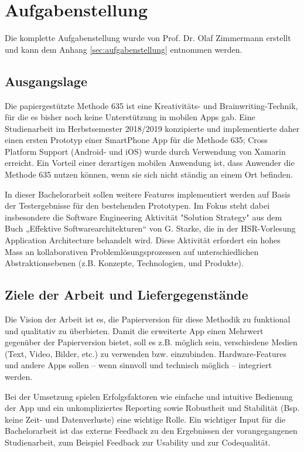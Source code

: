 
\thispagestyle{empty}
\section*{Aufgabenstellung}
Die komplette Aufgabenstellung wurde von Prof. Dr. Olaf Zimmermann erstellt und kann dem Anhang \ref{sec:aufgabenstellung} entnommen werden.

\subsection*{Ausgangslage}
Die papiergestützte Methode 635 ist eine Kreativitäts- und Brainwriting-Technik, für die es bisher noch keine Unterstützung in mobilen Apps gab. Eine Studienarbeit im Herbstsemester 2018/2019 konzipierte und implementierte daher einen ersten Prototyp einer SmartPhone App für die Methode 635; Cross Platform Support (Android- und iOS) wurde durch Verwendung von Xamarin erreicht. Ein Vorteil einer derartigen mobilen Anwendung ist, dass Anwender die Methode 635 nutzen können, wenn sie sich nicht ständig an einem Ort befinden. 


In dieser Bachelorarbeit sollen weitere Features implementiert werden auf Basis der Testergebnisse für den bestehenden Prototypen. Im Fokus steht dabei insbesondere die Software Engineering Aktivität "Solution Strategy" aus dem Buch „Effektive Softwarearchitekturen“ von G. Starke, die in der HSR-Vorlesung Application Architecture behandelt wird. Diese Aktivität erfordert ein hohes Mass an kollaborativen Problemlösungsprozessen auf unterschiedlichen Abstraktionsebenen (z.B. Konzepte, Technologien, und Produkte). 

\subsection*{Ziele der Arbeit und Liefergegenstände}\label{subsec:ziele}
Die Vision der Arbeit ist es, die Papierversion für diese Methodik zu funktional und qualitativ zu überbieten. Damit die erweiterte App einen Mehrwert gegenüber der Papierversion bietet, soll es z.B. möglich sein, verschiedene Medien (Text, Video, Bilder, etc.) zu verwenden bzw. einzubinden. Hardware-Features und andere Apps sollen – wenn sinnvoll und technisch möglich – integriert werden.

Bei der Umsetzung spielen Erfolgsfaktoren wie einfache und intuitive Bedienung der App und ein unkompliziertes Reporting sowie Robustheit und Stabilität (Bsp. keine Zeit- und Datenverluste) eine wichtige Rolle. Ein wichtiger Input für die Bachelorarbeit ist das externe Feedback zu den Ergebnissen der vorangegangenen Studienarbeit, zum Beispiel Feedback zur Usability und zur Codequalität.

